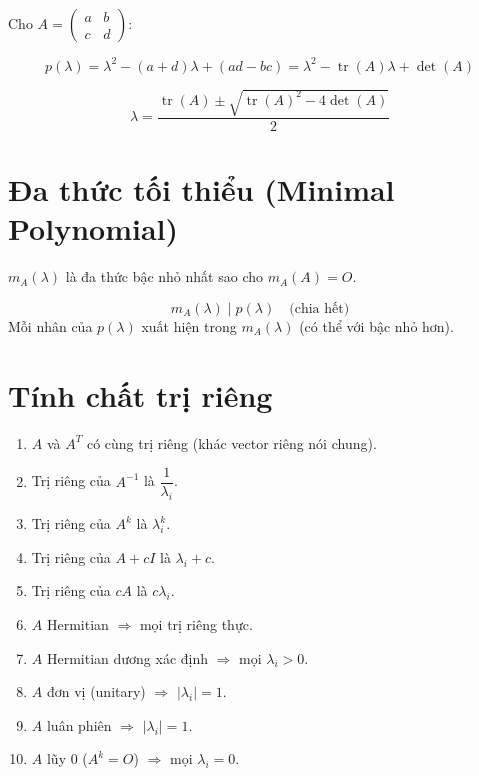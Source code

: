 Cho $A = \begin{pmatrix} a & b \\ c & d \end{pmatrix}$:

\[
p(\lambda) = \lambda^2 - (a+d)\lambda + (ad-bc) = \lambda^2 - \operatorname{tr}(A)\lambda + \det(A)
\]

\[
\lambda = \frac{\operatorname{tr}(A) \pm \sqrt{\operatorname{tr}(A)^2 - 4\det(A)}}{2}
\]

\section{Đa thức tối thiểu (Minimal Polynomial)}

$m_A(\lambda)$ là đa thức bậc nhỏ nhất sao cho $m_A(A) = O$.

\[
m_A(\lambda) \mid p(\lambda) \quad \text{(chia hết)}
\]
Mỗi nhân của $p(\lambda)$ xuất hiện trong $m_A(\lambda)$ (có thể với bậc nhỏ hơn).

\section{Tính chất trị riêng}

\begin{enumerate}
    \item $A$ và $A^T$ có cùng trị riêng (khác vector riêng nói chung).
    \item Trị riêng của $A^{-1}$ là $\dfrac{1}{\lambda_i}$.
    \item Trị riêng của $A^k$ là $\lambda_i^k$.
    \item Trị riêng của $A + cI$ là $\lambda_i + c$.
    \item Trị riêng của $cA$ là $c\lambda_i$.
    \item $A$ Hermitian $\Longrightarrow$ mọi trị riêng thực.
    \item $A$ Hermitian dương xác định $\Longrightarrow$ mọi $\lambda_i > 0$.
    \item $A$ đơn vị (unitary) $\Longrightarrow$ $|\lambda_i| = 1$.
    \item $A$ luân phiên $\Longrightarrow$ $|\lambda_i| = 1$.
    \item $A$ lũy 0 ($A^k = O$) $\Longrightarrow$ mọi $\lambda_i = 0$.
\end{enumerate}

